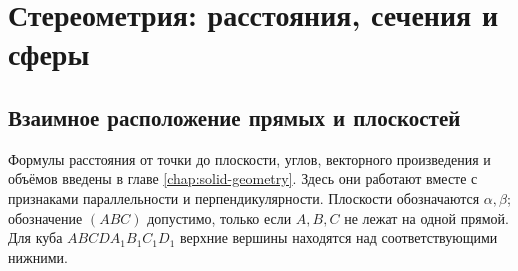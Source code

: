 \chapter{Стереометрия: расстояния, сечения и сферы}\label{chap:exam-solid}

\section{Взаимное расположение прямых и плоскостей}
Формулы расстояния от точки до плоскости, углов, векторного произведения и объёмов введены в главе \ref{chap:solid-geometry}. Здесь они работают вместе с признаками параллельности и перпендикулярности. Плоскости обозначаются \(\alpha,\beta\); обозначение \((ABC)\) допустимо, только если \(A,B,C\) не лежат на одной прямой. Для куба \(ABCDA_1B_1C_1D_1\) верхние вершины находятся над соответствующими нижними.


